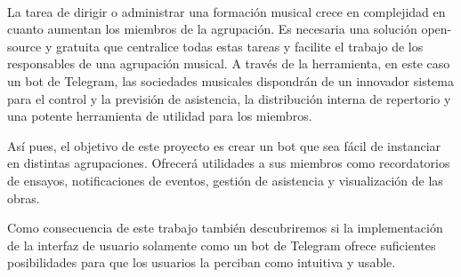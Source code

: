 \chapter*{}






\cleardoublepage
\thispagestyle{empty}

\begin{center}
{\large\bfseries \myTitle}\\
\end{center}
\begin{center}
\myName\\
\end{center}

\\

\vspace{0.7cm}
\\


La tarea de dirigir o administrar una formación musical crece en complejidad en cuanto aumentan los miembros de la agrupación. Es necesaria una solución open-source y gratuita que centralice todas estas tareas y facilite el trabajo de los responsables de una agrupación musical. A través de la herramienta, en este caso un bot de Telegram, las sociedades musicales dispondrán de un innovador sistema para el control y la previsión de asistencia, la distribución interna de repertorio y una potente herramienta de utilidad para los miembros.

Así pues, el objetivo de este proyecto es crear un bot que sea fácil de instanciar en distintas agrupaciones. Ofrecerá utilidades a sus miembros como recordatorios de ensayos, notificaciones de eventos, gestión de asistencia y visualización de las obras.

Como consecuencia de este trabajo también descubriremos si la implementación de la interfaz de usuario solamente como un bot de Telegram ofrece suficientes posibilidades para que los usuarios la perciban como intuitiva y usable.


